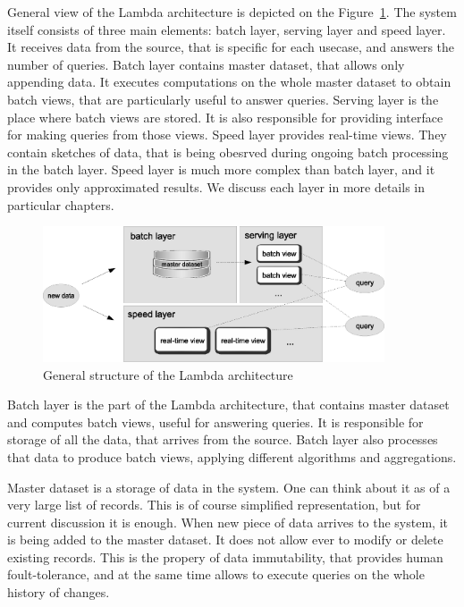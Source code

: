 
General view of the Lambda architecture is depicted on the
Figure~\ref{fig:lambda_architecture}.
The system itself consists of three main elements: batch layer, serving layer
and speed layer.
It receives data from the source, that is specific for each usecase, and answers
the number of queries.
Batch layer contains master dataset, that allows only appending data.
It executes computations on the whole master dataset to obtain batch views,
that are particularly useful to answer queries.
Serving layer is the place where batch views are stored.
It is also responsible for providing interface for making queries from those views.
Speed layer provides real-time views.
They contain sketches of data, that is being obesrved during ongoing batch
processing in the batch layer.
Speed layer is much more complex than batch layer, and it provides only approximated results.
We discuss each layer in more details in particular chapters.

\begin{figure}[H]
  \centering
  \includegraphics [width=0.9\textwidth]{images/LambdaArchitecture}
  \caption{General structure of the Lambda architecture}
  \label{fig:lambda_architecture}
\end{figure}


Batch layer is the part of the Lambda architecture, that contains master dataset
and computes batch views, useful for answering queries.
It is responsible for storage of all the data, that arrives from the source.
Batch layer also processes that data to produce batch views, applying different
algorithms and aggregations.

Master dataset  is a storage of data in the system.
One can think about it as of a very large list of records.
This is of course simplified representation, but for current discussion it is
enough.
When new piece of data arrives to the system, it is being added to the master dataset.
It does not allow ever to modify or delete existing records.
This is the propery of data immutability, that provides human foult-tolerance,
and at the same time allows to execute queries on the whole history of changes.

